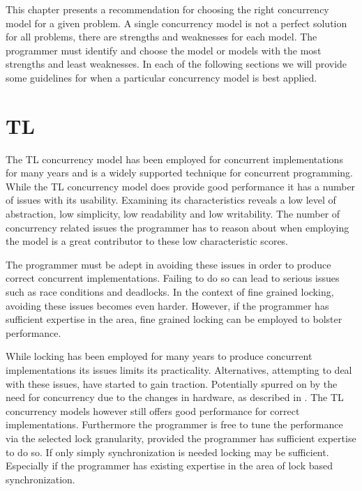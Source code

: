 \makeatletter {}\makeatother
{}
This chapter presents a recommendation for choosing the right concurrency model for a given problem. A single concurrency model is not a perfect solution for all problems, there are strengths and weaknesses for each model. The programmer must identify and choose the model or models with the most strengths and least weaknesses. In each of the following sections we will provide some guidelines for when a particular concurrency model is best applied.

\label{chap:choosing_con_model}


\section{\acl{TL}}\label{sec:choose_TL}
The \ac{TL} concurrency model has been employed for concurrent implementations for many years and is a widely supported technique for concurrent programming. While the \ac{TL} concurrency model does provide good performance it has a number of issues with its usability. Examining its characteristics reveals a low level of abstraction, low simplicity, low readability and low writability. The number of concurrency related issues the programmer has to reason about when employing the model is a great contributor to these low characteristic scores.

The programmer must be adept in avoiding these issues in order to produce correct concurrent implementations. Failing to do so can lead to serious issues such as race conditions and deadlocks. In the context of fine grained locking, avoiding these issues becomes even harder. However, if the programmer has sufficient expertise in the area, fine grained locking can be employed to bolster performance.

While locking has been employed for many years to produce concurrent implementations its issues limits its practicality. Alternatives, attempting to deal with these issues, have started to gain traction. Potentially spurred on by the need for concurrency due to the changes in hardware, as described in . The \ac{TL} concurrency models however still offers good performance for correct implementations. Furthermore the programmer is free to tune the performance via the selected lock granularity, provided the programmer has sufficient expertise to do so. If only simply synchronization is needed locking may be sufficient. Especially if the programmer has existing expertise in the area of lock based synchronization.

